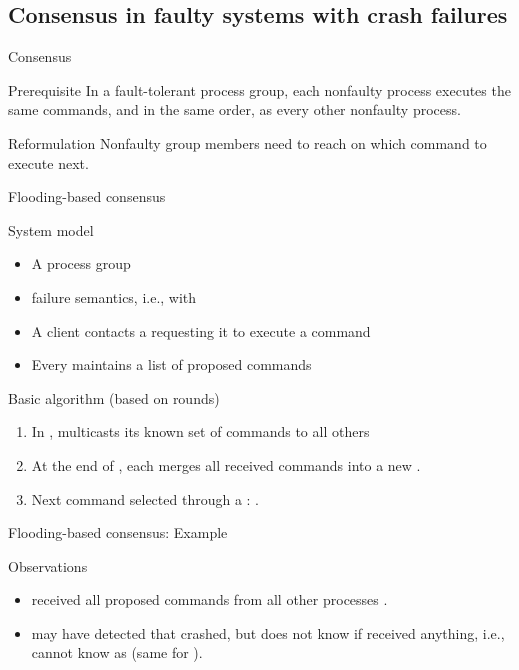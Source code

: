 \subsection{Consensus in faulty systems with crash failures}
\begin{slide}{Consensus}
  \begin{block}{Prerequisite}
    In a fault-tolerant process group, each nonfaulty process executes the same commands, and in the same
    order, as every other nonfaulty process.
  \end{block}
  \begin{alertblock}{Reformulation}
    Nonfaulty group members need to reach  on which command to execute next.
  \end{alertblock}
\end{slide}
\begin{slide}{Flooding-based consensus}
  \begin{block}{System model}
    \begin{itemize}
    \item A process group 
    \item {} failure semantics, i.e., with 
    \item A client contacts a  requesting it to execute a command
    \item Every  maintains a list of proposed commands
    \end{itemize}
  \end{block}
  \begin{block}{Basic algorithm (based on rounds)}
    \begin{enumerate}
    \item In  ,  multicasts its known set of commands  to
      all others
    \item At the end of , each  merges all received commands into a new
      .
    \item Next command  selected through a :
      .
    \end{enumerate}
  \end{block}
\end{slide}
\begin{slide}{Flooding-based consensus: Example}
  \centering{}
  \begin{block}{Observations}
    \begin{itemize}
    \item {} received all proposed commands from all other processes \mathexpr{\Rightarrow} 
      .
    \item {} may have detected that  crashed, but does not know if  received anything,
      i.e.,  cannot know  as  \mathexpr{\Rightarrow}
       (same for ).
    \end{itemize}
  \end{block}
\end{slide}
